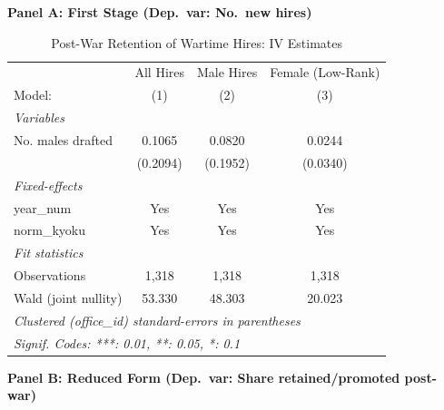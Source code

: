 \begin{table}[htbp]
\centering
\caption{Post-War Retention of Wartime Hires: IV Estimates}
\label{tab:postwar-iv}
\small
\begin{threeparttable}

\textbf{Panel A: First Stage (Dep.\ var: No.\ new hires)}
\medskip

\begin{tabular}{lccc}
   \tabularnewline \midrule \midrule
                        & All Hires     & Male Hires         & Female (Low-Rank) \\   
   Model:               & (1)           & (2)                & (3)\\  
   \midrule
   \emph{Variables}\\
   No. males drafted    & 0.1065        & 0.0820             & 0.0244\\   
                        & (0.2094)      & (0.1952)           & (0.0340)\\   
   \midrule
   \emph{Fixed-effects}\\
   year\_num            & Yes           & Yes                & Yes\\  
   norm\_kyoku          & Yes           & Yes                & Yes\\  
   \midrule
   \emph{Fit statistics}\\
   Observations         & 1,318         & 1,318              & 1,318\\  
   Wald (joint nullity) & 53.330        & 48.303             & 20.023\\  
   \midrule \midrule
   \multicolumn{4}{l}{\emph{Clustered (office\_id) standard-errors in parentheses}}\\
   \multicolumn{4}{l}{\emph{Signif. Codes: ***: 0.01, **: 0.05, *: 0.1}}\\
\end{tabular}

\bigskip

\textbf{Panel B: Reduced Form (Dep.\ var: Share retained/promoted post-war)}
\medskip


\end{threeparttable}
\end{table}
